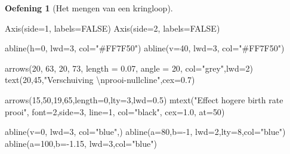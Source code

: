\documentclass[
  a4paper,
]{scrbook}
\newenvironment{Shaded}{\begin{snugshade}}{\end{snugshade}}
\newcommand{\AttributeTok}[1]{\textcolor[rgb]{0.40,0.45,0.13}{#1}}
\newcommand{\ConstantTok}[1]{\textcolor[rgb]{0.56,0.35,0.01}{#1}}
\newcommand{\DecValTok}[1]{\textcolor[rgb]{0.68,0.00,0.00}{#1}}
\newcommand{\FloatTok}[1]{\textcolor[rgb]{0.68,0.00,0.00}{#1}}
\newcommand{\FunctionTok}[1]{\textcolor[rgb]{0.28,0.35,0.67}{#1}}
\newcommand{\NormalTok}[1]{\textcolor[rgb]{0.00,0.23,0.31}{#1}}
\newcommand{\SpecialCharTok}[1]{\textcolor[rgb]{0.37,0.37,0.37}{#1}}
\newcommand{\StringTok}[1]{\textcolor[rgb]{0.13,0.47,0.30}{#1}}
\theoremstyle{definition}
\newtheorem{exercise}{Oefening}[chapter]
\theoremstyle{remark}
\begin{document}
\begin{exercise}[Het mengen van een
kringloop]
\begin{Shaded}
\begin{Highlighting}[]
\FunctionTok{Axis}\NormalTok{(}\AttributeTok{side=}\DecValTok{1}\NormalTok{, }\AttributeTok{labels=}\ConstantTok{FALSE}\NormalTok{)}
\FunctionTok{Axis}\NormalTok{(}\AttributeTok{side=}\DecValTok{2}\NormalTok{, }\AttributeTok{labels=}\ConstantTok{FALSE}\NormalTok{)}

\FunctionTok{abline}\NormalTok{(}\AttributeTok{h=}\DecValTok{0}\NormalTok{, }\AttributeTok{lwd=}\DecValTok{3}\NormalTok{, }\AttributeTok{col=}\StringTok{"\#FF7F50"}\NormalTok{)}
\FunctionTok{abline}\NormalTok{(}\AttributeTok{v=}\DecValTok{40}\NormalTok{, }\AttributeTok{lwd=}\DecValTok{3}\NormalTok{, }\AttributeTok{col=}\StringTok{"\#FF7F50"}\NormalTok{)}

\FunctionTok{arrows}\NormalTok{(}\DecValTok{20}\NormalTok{, }\DecValTok{63}\NormalTok{, }\DecValTok{20}\NormalTok{, }\DecValTok{73}\NormalTok{, }\AttributeTok{length =} \FloatTok{0.07}\NormalTok{, }\AttributeTok{angle =} \DecValTok{20}\NormalTok{, }\AttributeTok{col=}\StringTok{"grey"}\NormalTok{,}\AttributeTok{lwd=}\DecValTok{2}\NormalTok{)}
\FunctionTok{text}\NormalTok{(}\DecValTok{20}\NormalTok{,}\DecValTok{45}\NormalTok{,}\StringTok{"Verschuiving }\SpecialCharTok{\textbackslash{}n}\StringTok{prooi{-}nullcline"}\NormalTok{,}\AttributeTok{cex=}\FloatTok{0.7}\NormalTok{)}

\FunctionTok{arrows}\NormalTok{(}\DecValTok{15}\NormalTok{,}\DecValTok{50}\NormalTok{,}\DecValTok{19}\NormalTok{,}\DecValTok{65}\NormalTok{,}\AttributeTok{length=}\DecValTok{0}\NormalTok{,}\AttributeTok{lty=}\DecValTok{3}\NormalTok{,}\AttributeTok{lwd=}\FloatTok{0.5}\NormalTok{)}
\FunctionTok{mtext}\NormalTok{(}\StringTok{"Effect hogere birth rate prooi"}\NormalTok{, }\AttributeTok{font=}\DecValTok{2}\NormalTok{,}\AttributeTok{side=}\DecValTok{3}\NormalTok{, }\AttributeTok{line=}\DecValTok{1}\NormalTok{, }\AttributeTok{col=}\StringTok{"black"}\NormalTok{, }\AttributeTok{cex=}\FloatTok{1.0}\NormalTok{, }\AttributeTok{at=}\DecValTok{50}\NormalTok{)}

\FunctionTok{abline}\NormalTok{(}\AttributeTok{v=}\DecValTok{0}\NormalTok{, }\AttributeTok{lwd=}\DecValTok{3}\NormalTok{, }\AttributeTok{col=}\StringTok{"blue"}\NormalTok{,)}
\FunctionTok{abline}\NormalTok{(}\AttributeTok{a=}\DecValTok{80}\NormalTok{,}\AttributeTok{b=}\SpecialCharTok{{-}}\DecValTok{1}\NormalTok{, }\AttributeTok{lwd=}\DecValTok{2}\NormalTok{,}\AttributeTok{lty=}\DecValTok{8}\NormalTok{,}\AttributeTok{col=}\StringTok{"blue"}\NormalTok{)}
\FunctionTok{abline}\NormalTok{(}\AttributeTok{a=}\DecValTok{100}\NormalTok{,}\AttributeTok{b=}\SpecialCharTok{{-}}\FloatTok{1.15}\NormalTok{, }\AttributeTok{lwd=}\DecValTok{3}\NormalTok{,}\AttributeTok{col=}\StringTok{"blue"}\NormalTok{)}


\end{Highlighting}
\end{Shaded}
\end{exercise}
\end{document}
